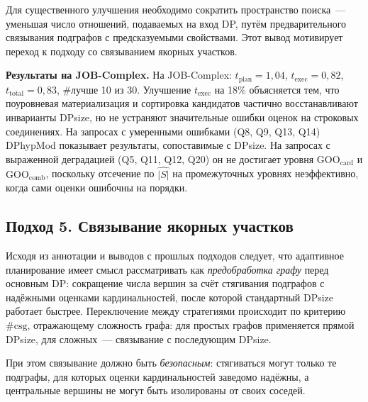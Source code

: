Для существенного улучшения необходимо сократить пространство поиска~--- уменьшая число отношений,
подаваемых на вход DP, путём предварительного связывания подграфов
с предсказуемыми свойствами.
Этот вывод мотивирует переход к подходу со связыванием якорных участков.

\textbf{Результаты на JOB-Complex.}
На JOB-Complex: $t_{\mathrm{plan}} = 1{,}04$,
$t_{\mathrm{exec}} = 0{,}82$, $t_{\mathrm{total}} = 0{,}83$, \#лучше 10 из 30.
Улучшение $t_{\mathrm{exec}}$ на 18\% объясняется тем, что поуровневая
материализация и сортировка кандидатов частично восстанавливают
инварианты DPsize, но не устраняют значительные ошибки оценок
на строковых соединениях.
На запросах с умеренными ошибками (Q8, Q9, Q13, Q14) DPhypMod
показывает результаты, сопоставимые с DPsize.
На запросах с выраженной деградацией (Q5, Q11, Q12, Q20)
он не достигает уровня $\mathrm{GOO_{card}}$ и $\mathrm{GOO_{comb}}$,
поскольку отсечение по $\widehat{|S|}$ на промежуточных уровнях
неэффективно, когда сами оценки ошибочны на порядки.
\par

\subsection{Подход 5. Связывание якорных участков}

Исходя из аннотации и выводов с прошлых подходов следует, 
что адаптивное планирование имеет смысл рассматривать как 
\emph{предобработка графу} перед основным DP:
сокращение числа вершин за счёт стягивания подграфов с надёжными
оценками кардинальностей, после которой стандартный DPsize
работает быстрее.
Переключение между стратегиями происходит по критерию
$\#\mathrm{csg}$, отражающему сложность графа: для простых графов применяется
прямой DPsize, для сложных~--- связывание с последующим DPsize.
\par

При этом связывание должно быть \emph{безопасным}: стягиваться
могут только те подграфы, для которых оценки кардинальностей
заведомо надёжны, а центральные вершины не могут быть изолированы
от своих соседей.
\par

